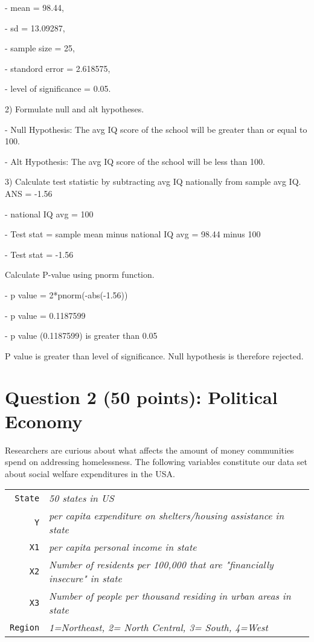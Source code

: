 \documentclass[12pt,letterpaper]{article}
\begin{document}
\begin{enumerate}
	 - mean = 98.44, 
	 
	 - sd = 13.09287, 
	 
	 - sample size = 25, 
	
	 - standord error = 2.618575, 
	
	 - level of significance = 0.05. 
	 
	 
	 
	 2) Formulate null and alt hypotheses. 
	 
	 - Null Hypothesis: The avg IQ score of the school will be greater than or equal to 100.
	 
	 - Alt Hypothesis: The avg IQ score of the school will be less than 100. 
	 
	 3) Calculate test statistic by subtracting avg IQ nationally from sample avg IQ. ANS = -1.56
	
	- national IQ avg = 100
	
	- Test stat = sample mean minus national IQ avg = 98.44 minus 100
	
	- Test stat = -1.56
	
	Calculate P-value using pnorm function.
	
	- p value = 2*pnorm(-abs(-1.56))
	
	- p value = 0.1187599
	
	- p value (0.1187599) is greater than 0.05
	
	P value is greater than level of significance. Null hypothesis is therefore rejected.
	
	
	
\end{enumerate}

\newpage

	\section*{Question 2 (50 points): Political Economy}

\noindent Researchers are curious about what affects the amount of money communities spend on addressing homelessness. The following variables constitute our data set about social welfare expenditures in the USA. \\
\vspace{.5cm}


\begin{tabular}{r|l}
	\texttt{State} &\emph{50 states in US} \\
	\texttt{Y} & \emph{per capita expenditure on shelters/housing assistance in state}\\
	\texttt{X1} &\emph{per capita personal income in state} \\
	\texttt{X2} &  \emph{Number of residents per 100,000 that are "financially insecure" in state}\\
	\texttt{X3} &  \emph{Number of people per thousand residing in urban areas in state} \\
	\texttt{Region} &  \emph{1=Northeast, 2= North Central, 3= South, 4=West} \\
\end{tabular}
\end{document}

